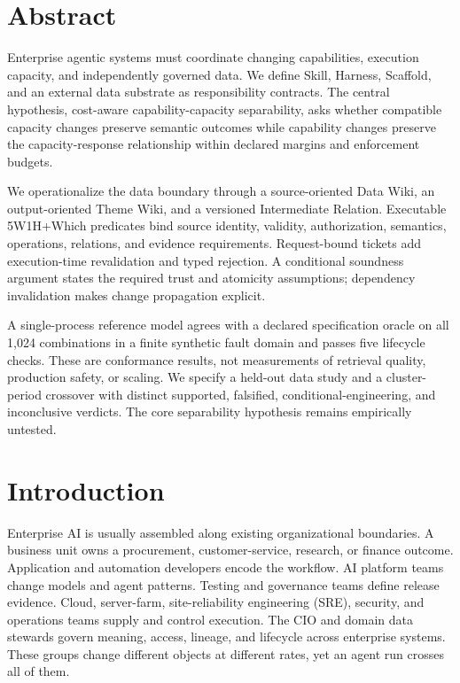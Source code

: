 

\section{Abstract}

Enterprise agentic systems must coordinate changing capabilities, execution capacity, and independently governed data. We define Skill, Harness, Scaffold, and an external data substrate as responsibility contracts. The central hypothesis, cost-aware capability-capacity separability, asks whether compatible capacity changes preserve semantic outcomes while capability changes preserve the capacity-response relationship within declared margins and enforcement budgets.

We operationalize the data boundary through a source-oriented Data Wiki, an output-oriented Theme Wiki, and a versioned Intermediate Relation. Executable 5W1H+Which predicates bind source identity, validity, authorization, semantics, operations, relations, and evidence requirements. Request-bound tickets add execution-time revalidation and typed rejection. A conditional soundness argument states the required trust and atomicity assumptions; dependency invalidation makes change propagation explicit.

A single-process reference model agrees with a declared specification oracle on all 1,024 combinations in a finite synthetic fault domain and passes five lifecycle checks. These are conformance results, not measurements of retrieval quality, production safety, or scaling. We specify a held-out data study and a cluster-period crossover with distinct supported, falsified, conditional-engineering, and inconclusive verdicts. The core separability hypothesis remains empirically untested.

\section{Introduction}
\label{sec:introduction}

Enterprise AI is usually assembled along existing organizational boundaries. A business unit owns a procurement, customer-service, research, or finance outcome. Application and automation developers encode the workflow. AI platform teams change models and agent patterns. Testing and governance teams define release evidence. Cloud, server-farm, site-reliability engineering (SRE), security, and operations teams supply and control execution. The CIO and domain data stewards govern meaning, access, lineage, and lifecycle across enterprise systems. These groups change different objects at different rates, yet an agent run crosses all of them.

